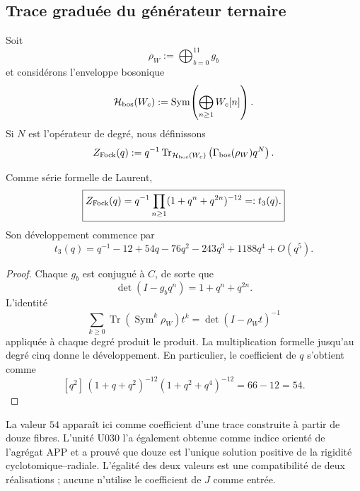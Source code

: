 \subsection{Trace graduée du générateur ternaire}

Soit
\[
 \rho_W:=\bigoplus_{b=0}^{11}g_b
\]
et considérons l'enveloppe bosonique
\begin{equation}
 \mathcal H_{\rm bos}(W_c)
 :=
 \operatorname{Sym}\!\left(
 \bigoplus_{n\ge1}W_c[n]
 \right).
 \label{p12-83-c20-s8:eq:fock-bosonico-doce-fibras-u031}
\end{equation}
Si \(N\) est l'opérateur de degré, nous définissons
\begin{equation}
 Z_{\rm Fock}(q)
 :=
 q^{-1}\operatorname{Tr}_{\mathcal H_{\rm bos}(W_c)}
 \left(\Gamma_{\rm bos}(\rho_W)q^N\right).
 \label{p12-83-c20-s8:eq:traza-graduada-fock-u031}
\end{equation}

\begin{proposition}
\label{p12-83-c20-s8:prop:producto-tres-doce-fibras-u031}
Comme série formelle de Laurent,
\begin{equation}
 \boxed{
 Z_{\rm Fock}(q)
 =q^{-1}\prod_{n\ge1}(1+q^n+q^{2n})^{-12}
 =:t_3(q).}
 \label{p12-83-c20-s8:eq:t3-producto-u031}
\end{equation}
Son développement commence par
\begin{equation}
 t_3(q)
 =q^{-1}-12+54q-76q^2-243q^3+1188q^4+O(q^5).
 \label{p12-83-c20-s8:eq:t3-expansion-u031}
\end{equation}
\end{proposition}

\begin{proof}
Chaque \(g_b\) est conjugué à \(C\), de sorte que
\[
 \det(I-g_bq^n)=1+q^n+q^{2n}.
\]
L’identité
\[
 \sum_{k\ge0}
 \operatorname{Tr}(\operatorname{Sym}^k\rho_W)t^k
 =\det(I-\rho_Wt)^{-1}
\]
appliquée à chaque degré produit le produit. La multiplication formelle jusqu'au
degré cinq donne le développement. En particulier, le coefficient de \(q\)
s'obtient comme
\[
 [q^2]\,
 (1+q+q^2)^{-12}(1+q^2+q^4)^{-12}
 =66-12=54.
\]
\end{proof}

La valeur \(54\) apparaît ici comme coefficient d'une trace construite à partir de
douze fibres. L'unité U030 l'a également obtenue comme indice orienté de
l'agrégat APP et a prouvé que douze est l'unique solution positive de la rigidité
cyclotomique--radiale. L'égalité des deux valeurs est une compatibilité de
deux réalisations ; aucune n'utilise le coefficient de \(J\) comme entrée.

